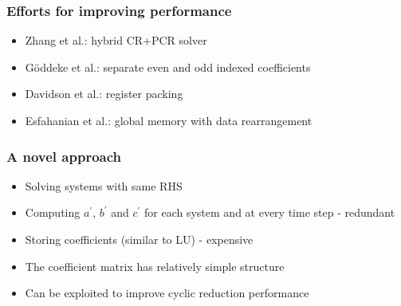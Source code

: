 \begin{frame}
\frametitle{Efforts for improving performance}
\begin{itemize}
    \item Zhang et al.: hybrid CR+PCR solver
    \item G{\"o}ddeke et al.: separate even and odd indexed
        coefficients
    \item Davidson et al.: register packing
    \item Esfahanian et al.: global memory with data rearrangement
\end{itemize}
\end{frame}

\begin{frame}
\frametitle{A novel approach}
\begin{itemize}
\item Solving systems with same RHS
\item Computing $a^\prime$, $b^\prime$ and $c^\prime$
    for each system and at every time step - redundant
\item Storing coefficients (similar to LU) - expensive
\item The coefficient matrix has relatively simple structure
\item Can be exploited to improve cyclic reduction performance
\end{itemize}
\end{frame}

